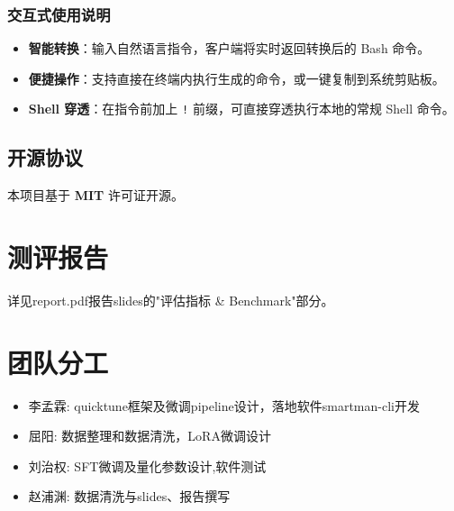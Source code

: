 \documentclass[UTF8,a4paper,12pt]{ctexart}
\begin{document}
\subsubsection{交互式使用说明}
\begin{itemize}
    \item \textbf{智能转换}：输入自然语言指令，客户端将实时返回转换后的 Bash 命令。
    \item \textbf{便捷操作}：支持直接在终端内执行生成的命令，或一键复制到系统剪贴板。
    \item \textbf{Shell 穿透}：在指令前加上 \texttt{!} 前缀，可直接穿透执行本地的常规 Shell 命令。
\end{itemize}

\subsection{开源协议}
本项目基于 \textbf{MIT} 许可证开源。

\section{测评报告}
详见report.pdf报告slides的"评估指标 \& Benchmark"部分。

\section{团队分工}
\begin{itemize}
  \item 李孟霖: quicktune框架及微调pipeline设计，落地软件smartman-cli开发
  \item 屈阳: 数据整理和数据清洗，LoRA微调设计
  \item 刘治权: SFT微调及量化参数设计,软件测试
  \item 赵浦渊: 数据清洗与slides、报告撰写
\end{itemize}

 

\end{document}
